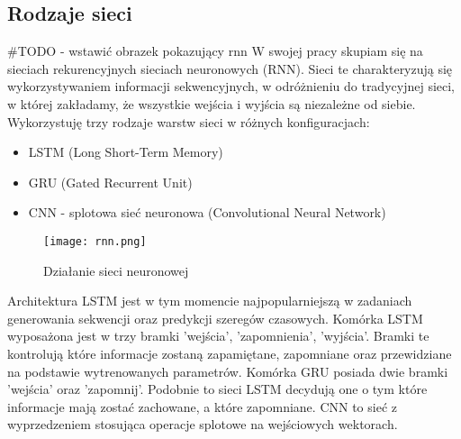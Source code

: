 \subsection {Rodzaje sieci}
\#TODO - wstawić obrazek pokazujący rnn
W swojej pracy skupiam się na sieciach rekurencyjnych sieciach neuronowych (RNN). Sieci te charakteryzują się wykorzystywaniem informacji 
sekwencyjnych, w odróżnieniu do tradycyjnej sieci, w której zakładamy, że wszystkie wejścia i wyjścia są niezależne od siebie. Wykorzystuję
trzy rodzaje warstw sieci w różnych konfiguracjach: 
\begin{itemize}
    \item LSTM (Long Short-Term Memory)
    \item GRU (Gated Recurrent Unit)
    \item CNN - splotowa sieć neuronowa (Convolutional Neural Network)
\end{itemize}
\begin{figure}[!h]
	\caption{Działanie sieci neuronowej}
    \label{fig:rnn}
    \centering \texttt{[image: rnn.png]}
\end{figure}
Architektura LSTM jest w tym momencie najpopularniejszą w zadaniach generowania sekwencji oraz predykcji szeregów czasowych. Komórka LSTM 
wyposażona jest w trzy bramki 'wejścia',  'zapomnienia', 'wyjścia'. Bramki te kontrolują które informacje zostaną zapamiętane, zapomniane
oraz przewidziane na podstawie wytrenowanych parametrów. Komórka GRU posiada dwie bramki 'wejścia' oraz 'zapomnij'. Podobnie to sieci LSTM 
decydują one o tym które informacje mają zostać zachowane, a które zapomniane. CNN to sieć z wyprzedzeniem stosująca operacje splotowe na wejściowych 
wektorach. 


